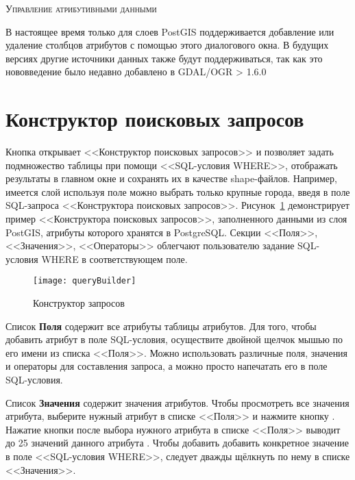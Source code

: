 \begin{Tip}\caption{\textsc{Управление атрибутивными данными}}
В настоящее время только для слоев PostGIS поддерживается добавление или
удаление столбцов атрибутов с помощью этого диалогового окна. В
будущих версиях \qg другие источники данных также будут поддерживаться,
так как это нововведение было недавно добавлено в GDAL/OGR > 1.6.0
\end{Tip}

\section{Конструктор поисковых запросов}\label{sec:query_builder}

Кнопка  открывает <<Конструктор поисковых
запросов>> и позволяет задать подмножество таблицы при помощи
<<SQL-условия WHERE>>, отображать результаты в главном окне и сохранять
их в качестве shape-файлов. Например, имеется слой 
используя поле  можно выбрать только крупные города,
введя  в поле SQL-запроса <<Конструктора
поисковых запросов>>. Рисунок~\ref{fig:query_builder} демонстрирует пример
<<Конструктора поисковых запросов>>, заполненного данными из слоя PostGIS,
атрибуты которого хранятся в PostgreSQL. Секции <<Поля>>, <<Значения>>,
<<Операторы>> облегчают пользователю задание SQL-условия WHERE в
соответствующем поле.

\begin{figure}[ht]
  \centering
    \texttt{[image: queryBuilder]}
    \caption{Конструктор запросов \nixcaption}\label{fig:query_builder}
\end{figure}

Список \textbf{Поля} содержит все атрибуты таблицы атрибутов. Для того,
чтобы добавить атрибут в поле SQL-условия, осуществите двойной щелчок мышью
по его имени из списка <<Поля>>. Можно использовать различные поля, значения
и операторы для составления запроса, а можно просто напечатать его в поле
SQL-условия.

Список \textbf{Значения} содержит значения атрибутов. Чтобы просмотреть все
значения атрибута, выберите нужный атрибут в списке <<Поля>> и нажмите кнопку
 . Нажатие кнопки
 после выбора нужного атрибута в списке <<Поля>> выводит
до 25 значений данного атрибута .
Чтобы добавить добавить конкретное значение в поле <<SQL-условия WHERE>>,
следует дважды щёлкнуть по нему в списке <<Значения>>.

